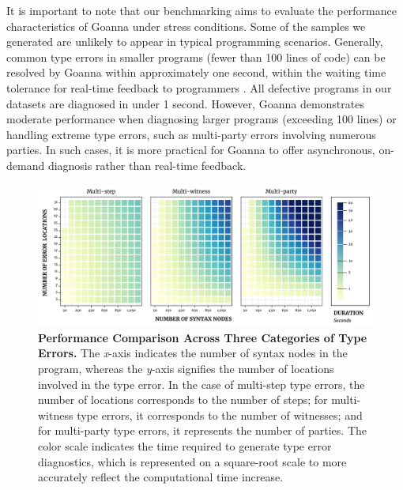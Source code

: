 \documentclass[pdflatex,lineno,sn-nature,Numbered]{sn-jnl}%
\begin{document}
It is important to note that our benchmarking aims to evaluate the performance characteristics of Goanna under stress conditions. Some of the samples we generated are unlikely to appear in typical programming scenarios. Generally, common type errors in smaller programs (fewer than 100 lines of code) can be resolved by Goanna within approximately one second, within the waiting time tolerance for real-time feedback to programmers \cite{Ferdowsi2023-au}. All defective programs in our datasets are diagnosed in under 1 second. However, Goanna demonstrates moderate performance when diagnosing larger programs (exceeding 100 lines) or handling extreme type errors, such as multi-party errors involving numerous parties. In such cases, it is more practical for Goanna to offer asynchronous, on-demand diagnosis rather than real-time feedback. 



\begin{figure}[ht]
    \centering
    \includegraphics[width=\linewidth]{images/Compare}
\caption{{\bf Performance Comparison Across Three Categories of Type Errors.} The {\it x}-axis indicates the number of syntax nodes in the program, whereas the {\it y}-axis signifies the number of locations involved in the type error. In the case of multi-step type errors, the number of locations corresponds to the number of steps; for multi-witness type errors, it corresponds to the number of witnesses; and for multi-party type errors, it represents the number of parties. The color scale indicates the time required to generate type error diagnostics, which is represented on a square-root scale to more accurately reflect the computational time increase.}
    \label{fig:compare-time}
\end{figure}
\end{document}
